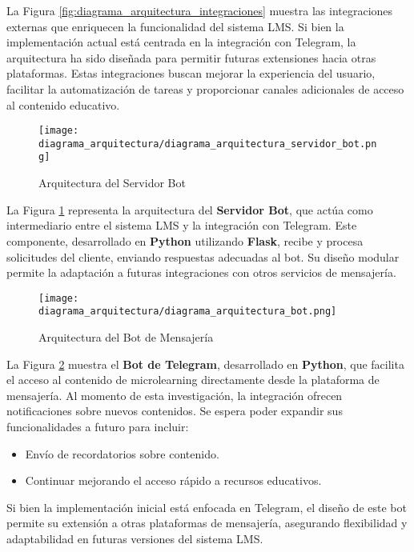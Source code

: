 La Figura \ref{fig:diagrama_arquitectura_integraciones} muestra las
integraciones externas que enriquecen la funcionalidad del sistema LMS. Si bien
la implementación actual está centrada en la integración con Telegram, la
arquitectura ha sido diseñada para permitir futuras extensiones hacia otras
plataformas. Estas integraciones buscan mejorar la experiencia del usuario,
facilitar la automatización de tareas y proporcionar canales adicionales de
acceso al contenido educativo.

\begin{figure}[H]
    \centering
    \texttt{[image: diagrama\_arquitectura/diagrama\_arquitectura\_servidor\_bot.png]}
    \caption{Arquitectura del Servidor Bot}
    \label{fig:diagrama_arquitectura_servidor_bot}
\end{figure}

La Figura \ref{fig:diagrama_arquitectura_servidor_bot} representa la
arquitectura del \textbf{Servidor Bot}, que actúa como intermediario entre el
sistema LMS y la integración con Telegram. Este componente, desarrollado en
\textbf{Python} utilizando \textbf{Flask}, recibe y procesa solicitudes del
cliente, enviando respuestas adecuadas al bot. Su diseño modular permite la
adaptación a futuras integraciones con otros servicios de mensajería.

\begin{figure}[H]
    \centering
    \texttt{[image: diagrama\_arquitectura/diagrama\_arquitectura\_bot.png]}
    \caption{Arquitectura del Bot de Mensajería}
    \label{fig:diagrama_arquitectura_bot}
\end{figure}

La Figura \ref{fig:diagrama_arquitectura_bot} muestra el \textbf{Bot de
Telegram}, desarrollado en \textbf{Python}, que facilita el acceso al contenido
de microlearning directamente desde la plataforma de mensajería.
Al momento de esta investigación, la integración ofrecen notificaciones sobre nuevos contenidos.
Se espera poder expandir sus funcionalidades a futuro para incluir:
\begin{itemize}
    \item Envío de recordatorios sobre contenido.
    \item Continuar mejorando el acceso rápido a recursos educativos.
\end{itemize}

Si bien la implementación inicial está enfocada en Telegram, el diseño de este
bot permite su extensión a otras plataformas de mensajería, asegurando
flexibilidad y adaptabilidad en futuras versiones del sistema LMS.





